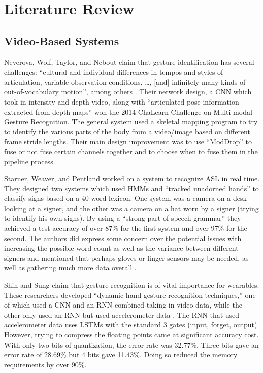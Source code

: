 \documentclass[]{report}
\begin{document}
\section{Literature Review}

\subsection{Video-Based Systems}

Neverova, Wolf, Taylor, and Nebout claim that gesture identification has several challenges: “cultural and individual differences in tempos and styles of articulation, variable observation conditions, …, [and] infinitely many kinds of out-of-vocabulary motion”, among others \cite{Neverova}. Their network design, a CNN which took in intensity and depth video, along with “articulated pose information extracted from depth maps” won the 2014 ChaLearn Challenge on Multi-modal Gesture Recognition. The general system used a skeletal mapping program to try to identify the various parts of the body from a video/image based on different frame stride lengths. Their main design improvement was to use “ModDrop” to fuse or not fuse certain channels together and to choose when to fuse them in the pipeline process. 

Starner, Weaver, and Pentland worked on a system to recognize ASL in real time. They designed two systems which used HMMs and “tracked unadorned hands” to classify signs based on a 40 word lexicon. One system was a camera on a desk looking at a signer, and the other was a camera on a hat worn by a signer (trying to identify his own signs). By using a “strong part-of-speech grammar” they achieved a test accuracy of over 87\% for the first system and over 97\% for the second. The authors did express some concern over the potential issues with increasing the possible word-count as well as the variance between different signers and mentioned that perhaps gloves or finger sensors may be needed, as well as gathering much more data overall \cite{Starner98}.

Shin and Sung claim that gesture recognition is of vital importance for wearables. These researchers developed “dynamic hand gesture recognition techniques,” one of which used a CNN and an RNN combined taking in video data, while the other only used an RNN but used accelerometer data \cite{ShinS16}. The RNN that used accelerometer data uses LSTMs with the standard 3 gates (input, forget, output). However, trying to compress the floating points came at significant accuracy cost. With only two bits of quantization, the error rate was 32.77\%. Three bits gave an error rate of 28.69\% but 4 bits gave 11.43\%. Doing so reduced the memory requirements by over 90\%. 
\end{document}
